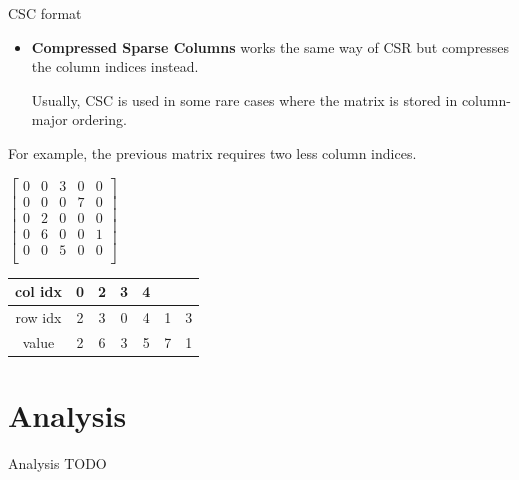 \documentclass{beamer}
\begin{document}
	\begin{frame}{CSC format}
		\begin{itemize}
			\item \textbf{Compressed Sparse Columns} works the same way of CSR but compresses the column indices instead.
			
			\bigskip
			Usually, CSC is used in some rare cases where the matrix is stored in column-major ordering.
		\end{itemize}
		For example, the previous matrix requires two less column indices.\\
		
		\bigskip
		\begin{minipage}{.48\textwidth}
			\begin{center}
				$\begin{bmatrix}
					0 & 0 & 3 & 0 & 0 \\
					0 & 0 & 0 & 7 & 0 \\
					0 & 2 & 0 & 0 & 0 \\
					0 & 6 & 0 & 0 & 1 \\
					0 & 0 & 5 & 0 & 0 \\
				\end{bmatrix}$
			\end{center}
		\end{minipage}
		\hfill
		\begin{minipage}{.48\textwidth}
			\begin{center}
				\def\arraystretch{2}
				\begin{tabular}{|c|c|c|c|c|cc}
					\cline{1-5}
					col idx & 0 & 2 & 3 & 4 &                        &                        \\ \hline
					row idx & 2 & 3 & 0 & 4 & \multicolumn{1}{c|}{1} & \multicolumn{1}{c|}{3} \\ \hline
					value   & 2 & 6 & 3 & 5 & \multicolumn{1}{c|}{7} & \multicolumn{1}{c|}{1} \\ \hline
				\end{tabular}
			\end{center}
		\end{minipage}
	\end{frame}
	
	\section{Analysis}
	\begin{frame}{Analysis}
		TODO
	\end{frame}
	
\end{document}

